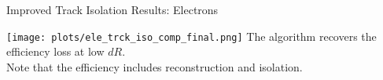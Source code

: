 \documentclass{beamer}
\begin{document}
\begin{frame}{Improved Track Isolation Results: Electrons}
  \begin{center}

    \vspace{-0.2cm}
    \texttt{[image: plots/ele\_trck\_iso\_comp\_final.png]}
    \vspace{-0.1cm}
    The algorithm recovers the efficiency loss at low $dR$.\\Note that the efficiency includes reconstruction and isolation.
  \end{center}
\end{frame}
\end{document}
